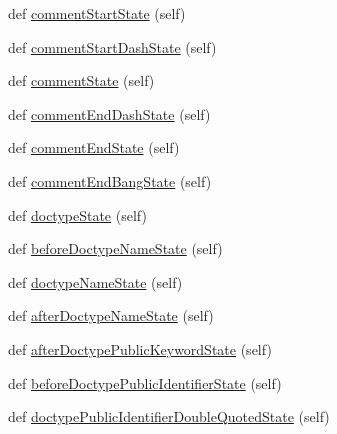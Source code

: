 \begin{DoxyCompactItemize}
\item 
def \hyperlink{classpip_1_1__vendor_1_1html5lib_1_1__tokenizer_1_1HTMLTokenizer_a0feb931b0e479d162005f8338e7de52e}{comment\+Start\+State} (self)
\item 
def \hyperlink{classpip_1_1__vendor_1_1html5lib_1_1__tokenizer_1_1HTMLTokenizer_a7298e7d8ba32e9cb5c0b71b0d7f21f98}{comment\+Start\+Dash\+State} (self)
\item 
def \hyperlink{classpip_1_1__vendor_1_1html5lib_1_1__tokenizer_1_1HTMLTokenizer_aa372516e2fec3159940b40be58f12142}{comment\+State} (self)
\item 
def \hyperlink{classpip_1_1__vendor_1_1html5lib_1_1__tokenizer_1_1HTMLTokenizer_a69c493c0458133c83de8e3ca0984e34c}{comment\+End\+Dash\+State} (self)
\item 
def \hyperlink{classpip_1_1__vendor_1_1html5lib_1_1__tokenizer_1_1HTMLTokenizer_a7f1c054f8262619ebe026c1c4c4edf1d}{comment\+End\+State} (self)
\item 
def \hyperlink{classpip_1_1__vendor_1_1html5lib_1_1__tokenizer_1_1HTMLTokenizer_a3eafaa79048473e54cff32c3737f84db}{comment\+End\+Bang\+State} (self)
\item 
def \hyperlink{classpip_1_1__vendor_1_1html5lib_1_1__tokenizer_1_1HTMLTokenizer_afb1768bd3408e887cdfa490fb464cd1e}{doctype\+State} (self)
\item 
def \hyperlink{classpip_1_1__vendor_1_1html5lib_1_1__tokenizer_1_1HTMLTokenizer_a5825bca2482af283b93eaff7df8ce06d}{before\+Doctype\+Name\+State} (self)
\item 
def \hyperlink{classpip_1_1__vendor_1_1html5lib_1_1__tokenizer_1_1HTMLTokenizer_a75e83ba0343c595e42a7d77909d23441}{doctype\+Name\+State} (self)
\item 
def \hyperlink{classpip_1_1__vendor_1_1html5lib_1_1__tokenizer_1_1HTMLTokenizer_a3705ea49281e4f8f48e62ad21e42087d}{after\+Doctype\+Name\+State} (self)
\item 
def \hyperlink{classpip_1_1__vendor_1_1html5lib_1_1__tokenizer_1_1HTMLTokenizer_a85375ec13d048b11cd3cc5c098a7d09d}{after\+Doctype\+Public\+Keyword\+State} (self)
\item 
def \hyperlink{classpip_1_1__vendor_1_1html5lib_1_1__tokenizer_1_1HTMLTokenizer_a4c987d9e7d8ef8f29453f01d4f03c32f}{before\+Doctype\+Public\+Identifier\+State} (self)
\item 
def \hyperlink{classpip_1_1__vendor_1_1html5lib_1_1__tokenizer_1_1HTMLTokenizer_ac6e808a56985fe7e4bbd6e78bbd68f18}{doctype\+Public\+Identifier\+Double\+Quoted\+State} (self)
\item 

\end{DoxyCompactItemize}
